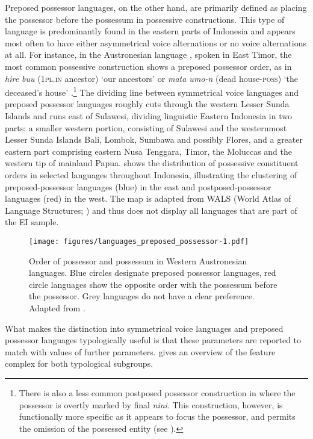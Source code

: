 Preposed possessor languages, on the other hand, are primarily defined as placing the possessor before the possessum in possessive constructions. This type of language is predominantly found in the eastern parts of Indonesia and appears most often to have either asymmetrical voice alternations or no voice alternations at all. For instance, in the Austronesian language , spoken in East Timor, the most common possessive construction shows a preposed possessor order, as in \textit{hire buu} (1\textsc{pl}.\textsc{in} ancestor) `our ancestors' or \textit{mata umo-n} (dead house-\textsc{poss}) `the deceased's house' \citep[31]{bowden2006} .\footnote{There is also a less common postposed possessor construction in  where the possessor is overtly marked by final \textit{nini}. This construction, however, is functionally more specific as it appears to focus the possessor, and permits the omission of the possessed entity (see \citealt[32]{bowden2006}).} The dividing line between symmetrical voice languages and preposed possessor languages roughly cuts through the western Lesser Sunda Islands and runs east of Sulawesi, dividing linguistic Eastern Indonesia in two parts: a smaller western portion, consisting of Sulawesi and the westernmost Lesser Sunda Islands Bali, Lombok, Sumbawa and possibly Flores, and a greater eastern part comprising eastern Nusa Tenggara, Timor, the Moluccas and the western tip of mainland Papua.  shows the distribution of possessive constituent orders in selected languages throughout Indonesia, illustrating the clustering of preposed-possessor languages (blue) in the east and postposed-possessor languages (red) in the west. The map is adapted from WALS (World Atlas of Language Structures; \citealt{wals-86}) and thus does not display all languages that are part of the EI sample.

\begin{sidewaysfigure}
\texttt{[image: figures/languages\_preposed\_possessor-1.pdf]}
\caption[Order of possessor and possessum in Western Austronesian languages]{Order of possessor and possessum in Western Austronesian languages. Blue circles designate preposed possessor languages, red circle languages show the opposite order with the possessum before the possessor. Grey languages do not have a clear preference. Adapted from \citet{wals-86}.}\label{figure:preposed}
\end{sidewaysfigure}

What makes the distinction into symmetrical voice languages and preposed possessor languages typologically useful is that these parameters are reported to match with values of further parameters.  gives an overview of the feature complex for both typological subgroups. 

